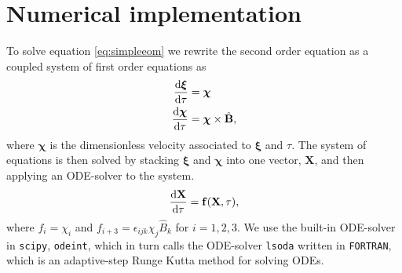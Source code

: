 \section{Numerical implementation}

To solve equation \ref{eq:simpleeom} we rewrite the second order equation as a coupled system of first order equations as
\begin{align}\label{eq:system}
	\frac{\text{d} \boldsymbol{\xi}}{\text{d} \tau} &= \boldsymbol{\chi} \\
	\frac{\text{d} \boldsymbol{\chi}}{\text{d} \tau} &= \boldsymbol{\chi} \times \hat{\mathbf{B}},
\end{align}
where $\boldsymbol{\chi}$ is the dimensionless velocity associated to $\boldsymbol{\xi}$ and $\tau$. The system of equations is then solved by stacking $\boldsymbol{\xi}$ and $\boldsymbol{\chi}$ into one vector, $\mathbf{X}$, and then applying an ODE-solver to the system.
\begin{equation}\label{eq:ODE}
	\frac{\text{d} \mathbf{X}}{\text{d} \tau} = \mathbf{f}(\mathbf{X},\tau),
\end{equation}
where $f_i = \chi_i$ and $f_{i+3} = \epsilon_{ijk} \chi_j \hat{B}_k $ for $i=1,2,3$. We use the built-in ODE-solver in \texttt{scipy}, \texttt{odeint}, which in turn calls the ODE-solver \texttt{lsoda} written in \texttt{FORTRAN}, which is an adaptive-step Runge Kutta method for solving ODEs.

\newpage
